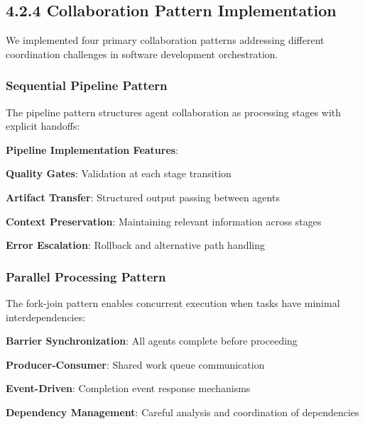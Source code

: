 \subsection*{4.2.4 Collaboration Pattern Implementation}

We implemented four primary collaboration patterns addressing different coordination challenges in software development orchestration.

\subsubsection*{Sequential Pipeline Pattern}

The pipeline pattern structures agent collaboration as processing stages with explicit handoffs:

\begin{successbox}
\textbf{Pipeline Implementation Features}:
\begin{compactlist}
    \item \textbf{Quality Gates}: Validation at each stage transition
    \item \textbf{Artifact Transfer}: Structured output passing between agents
    \item \textbf{Context Preservation}: Maintaining relevant information across stages
    \item \textbf{Error Escalation}: Rollback and alternative path handling
\end{compactlist}
\end{successbox}

\subsubsection*{Parallel Processing Pattern}

The fork-join pattern enables concurrent execution when tasks have minimal interdependencies:

\begin{compactlist}
    \item \textbf{Barrier Synchronization}: All agents complete before proceeding
    \item \textbf{Producer-Consumer}: Shared work queue communication
    \item \textbf{Event-Driven}: Completion event response mechanisms
    \item \textbf{Dependency Management}: Careful analysis and coordination of dependencies
\end{compactlist}

